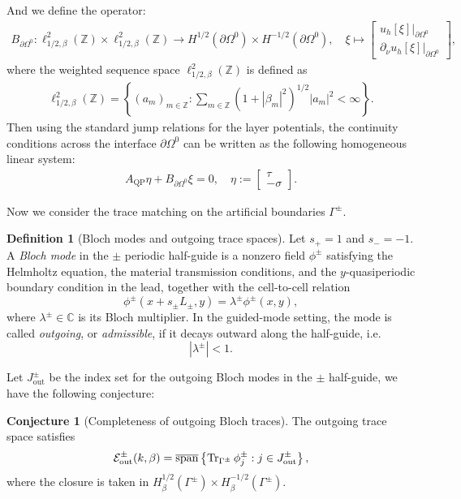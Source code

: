 \documentclass[11pt,fleqn]{article}
\theoremstyle{definition}
\newtheorem{definition}{Definition}
\newtheorem{conjecture}{Conjecture}
\theoremstyle{remark}
\begin{document}
And we define the operator: \begin{align}
  B_{\partial \Omega^0}: \ell^2_{1/2,\beta}(\mathbb{Z}) \times \ell^2_{1/2,\beta}(\mathbb{Z}) \to H^{1/2}(\partial \Omega^0) \times H^{-1/2}(\partial \Omega^0),\quad 
  \xi \mapsto \begin{bmatrix}
    \left. u_h[\xi] \right|_{\partial \Omega^0}\\
    \left.\partial_\nu u_h[\xi] \right|_{\partial \Omega^0}
  \end{bmatrix},
\end{align}
where the weighted sequence space $\ell^2_{1/2,\beta}(\mathbb{Z})$ is defined as 
\begin{align*}
  \ell^2_{1/2,\beta}(\mathbb{Z}) = \left\{(a_m)_{m\in\mathbb{Z}}: \sum_{m\in\mathbb{Z}} (1 + |\beta_m|^2)^{1/2} |a_m|^2 < \infty\right\}.
\end{align*}
Then using the standard jump relations for the layer potentials, the continuity conditions across the interface $\partial \Omega^0$ can be written as the following homogeneous linear system:
\begin{align}
  A_\mathrm{QP}\eta + B_{\partial \Omega^0}\xi = 0,\quad \eta := \begin{bmatrix} \tau\\ -\sigma \end{bmatrix}.
\end{align}

Now we consider the trace matching on the artificial boundaries $\Gamma^\pm$. 
\begin{definition}[Bloch modes and outgoing trace spaces] \label{def:bloch-mode}
Let \(s_+=1\) and \(s_-=-1\). A \emph{Bloch mode} in the \(\pm\) periodic half-guide is a nonzero
field \(\phi^\pm\) satisfying the Helmholtz equation, the material transmission conditions,
and the \(y\)-quasiperiodic boundary condition in the lead, together with the cell-to-cell
relation
\[
  \phi^\pm(x+s_\pm L_\pm,y)=\lambda^\pm \phi^\pm(x,y),
\]
where \(\lambda^\pm\in\mathbb C\) is its Bloch multiplier. In the guided-mode setting, the
mode is called \emph{outgoing}, or \emph{admissible}, if it decays outward along the half-guide, i.e.
\[
  |\lambda^\pm|<1.
\]
\end{definition}
Let $J^\pm_\mathrm{out}$ be the index set for the outgoing Bloch modes in the $\pm$ half-guide, we have the following conjecture:
\begin{conjecture}[Completeness of outgoing Bloch traces]
\label{conj:outgoing-trace-completeness}
The outgoing trace space satisfies
\[
  \mathcal E^\pm_{\rm out}(k,\beta)
  =
  \overline{\operatorname{span}}
  \left\{
    \operatorname{Tr}_{\Gamma^\pm}\phi_j^\pm:
    j\in J^\pm_{\rm out}
  \right\},
\]
where the closure is taken in 
$H^{1/2}_\beta(\Gamma^\pm) \times H^{-1/2}_\beta(\Gamma^\pm)$.
\end{conjecture}
\end{document}
